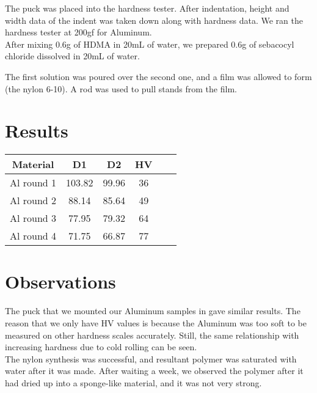 \documentclass{article}
\begin{document}
The puck was placed into the hardness tester. After indentation, height and width data of the indent was taken down along with hardness data. We ran the hardness tester at 200gf for Aluminum.\\

After mixing 0.6g of HDMA in 20mL of water, we prepared 0.6g of sebacocyl chloride dissolved in 20mL of water.

The first solution was poured over the second one, and a film was allowed to form (the nylon 6-10). A rod was used to pull stands from the film.
\section{Results}

\begin{table}[h]
\centering
\begin{tabular}{|| c | c | c | c | c | c ||}
\hline
Material & D1 & D2 & HV\\
\hline
\hline
Al round 1 & 103.82 & 99.96 & 36\\
\hline
Al round 2 & 88.14 & 85.64 & 49\\
\hline
Al round 3 & 77.95 & 79.32 & 64\\
\hline
Al round 4 & 71.75 & 66.87 & 77\\
\hline
\end{tabular}
\end{table}

\section{Observations}

The puck that we mounted our Aluminum samples in gave similar results. The reason that we only have HV values is because the Aluminum was too soft to be measured on other hardness scales accurately. Still, the same relationship with increasing hardness due to cold rolling can be seen.\\

The nylon synthesis was successful, and resultant polymer was saturated with water after it was made. After waiting a week, we observed the polymer after it had dried up into a sponge-like material, and it was not very strong.
\end{document}
